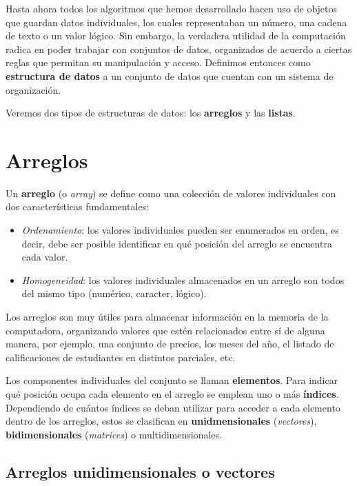 \documentclass[
]{book}
\providecommand{\tightlist}{%
  \setlength{\itemsep}{0pt}\setlength{\parskip}{0pt}}
\begin{document}
Hasta ahora todos los algoritmos que hemos desarrollado hacen uso de objetos que guardan datos individuales, los cuales representaban un número, una cadena de texto o un valor lógico. Sin embargo, la verdadera utilidad de la computación radica en poder trabajar con conjuntos de datos, organizados de acuerdo a ciertas reglas que permitan su manipulación y acceso. Definimos entonces como \textbf{estructura de datos} a un conjunto de datos que cuentan con un sistema de organización.

Veremos dos tipos de estructuras de datos: los \textbf{arreglos} y las \textbf{listas}.

\hypertarget{arreglos}{%
\section{Arreglos}\label{arreglos}}

Un \textbf{arreglo} (o \emph{array}) se define como una colección de valores individuales con dos características fundamentales:

\begin{itemize}
\tightlist
\item
  \emph{Ordenamiento}: los valores individuales pueden ser enumerados en orden, es decir, debe ser posible identificar en qué posición del arreglo se encuentra cada valor.
\item
  \emph{Homogeneidad}: los valores individuales almacenados en un arreglo son todos del mismo tipo (numérico, caracter, lógico).
\end{itemize}

Los arreglos son muy útiles para almacenar información en la memoria de la computadora, organizando valores que estén relacionados entre sí de alguna manera, por ejemplo, una conjunto de precios, los meses del año, el listado de calificaciones de estudiantes en distintos parciales, etc.

Los componentes individuales del conjunto se llaman \textbf{elementos}. Para indicar qué posición ocupa cada elemento en el arreglo se emplean uno o más \textbf{índices}. Dependiendo de cuántos índices se deban utilizar para acceder a cada elemento dentro de los arreglos, estos se clasifican en \textbf{unidmensionales} (\emph{vectores}), \textbf{bidimensionales} (\emph{matrices}) o multidimensionales.

\hypertarget{arreglos-unidimensionales-o-vectores}{%
\subsection{Arreglos unidimensionales o vectores}\label{arreglos-unidimensionales-o-vectores}}
\end{document}

